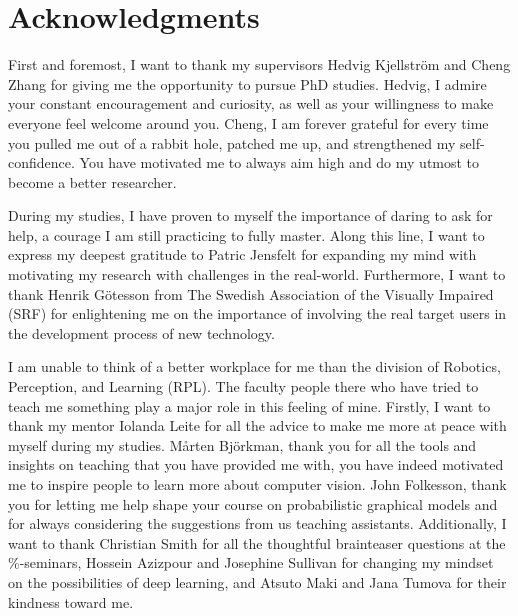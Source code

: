 
\chapter{Acknowledgments}
\label{chap:acknowledgements}

\noindent First and foremost, I want to thank my supervisors Hedvig Kjellström and Cheng Zhang for giving me the opportunity to pursue PhD studies. Hedvig, I admire your constant encouragement and curiosity, as well as your willingness to make everyone feel welcome around you. Cheng, I am forever grateful for every time you pulled me out of a rabbit hole, patched me up, and strengthened my self-confidence. You have motivated me to always aim high and do my utmost to become a better researcher. 
\newline


\noindent 
During my studies, I have proven to myself the importance of daring to ask for help, a courage I am still practicing to fully master. Along this line, I want to express my deepest gratitude to Patric Jensfelt for expanding my mind with motivating my research with challenges in the real-world.
Furthermore, I want to thank Henrik Götesson from The Swedish Association of the Visually Impaired (SRF) for enlightening me on the importance of involving the real target users in the development process of new technology. 
\newline 


\noindent 
I am unable to think of a better workplace for me than the division of Robotics, Perception, and Learning (RPL). %
The faculty people there who have tried to teach me something play a major role in this feeling of mine. 
Firstly, I want to thank my mentor Iolanda Leite for all the advice to make me more at peace with myself during my studies. 
Mårten Björkman, thank you for all the tools and insights on teaching that you have provided me with, you have indeed motivated me to inspire people to learn more about computer vision. %
John Folkesson, thank you for letting me help shape your course on probabilistic graphical models and for always considering the suggestions from us teaching assistants. Additionally, I want to thank 
Christian Smith for all the thoughtful brainteaser questions at the \%-seminars, 
Hossein Azizpour and Josephine Sullivan for changing my mindset on the possibilities of deep learning, 
and Atsuto Maki and Jana Tumova for their kindness toward me.  
\newline 


